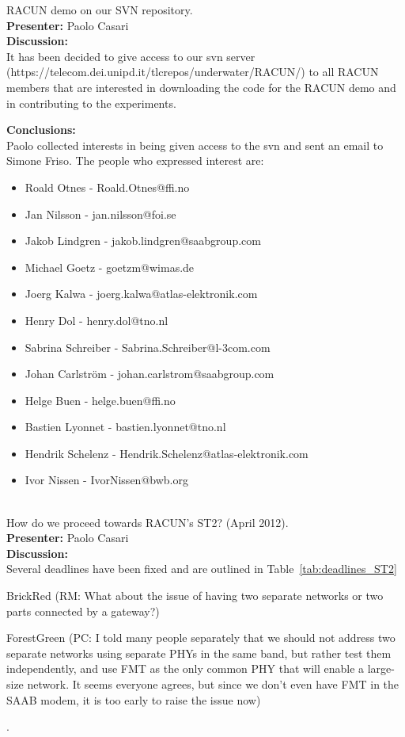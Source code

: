 \documentclass[11pt,journal,draftclsnofoot,onecolumn,twoside,letterpaper]{IEEEtran}
\newcommand{\RM}[1]{\begin{color}{BrickRed} (RM: #1) \end{color}}
\newcommand{\PC}[1]{\begin{color}{ForestGreen} (PC: #1) \end{color}}
\theoremstyle{definition} \newtheorem{definition}[]{Definition}
\theoremstyle{theorem} \newtheorem{theorem}[]{Theorem}
\begin{document}
 RACUN demo on our SVN repository.\\
{\bf Presenter:} Paolo Casari \\
{\bf Discussion:} \\

It has been decided to give access to our svn server (https://telecom.dei.unipd.it/tlcrepos/underwater/RACUN/) to all RACUN members that are interested in downloading the code for the RACUN demo and in contributing to the experiments.

{\bf Conclusions:} \\
Paolo collected interests in being given access to the svn and sent an email to Simone Friso. The people who expressed interest are:
\begin{itemize}
 \item    Roald Otnes  -  Roald.Otnes@ffi.no
 \item    Jan Nilsson  -  jan.nilsson@foi.se
 \item    Jakob Lindgren  -  jakob.lindgren@saabgroup.com
 \item    Michael Goetz  -  goetzm@wimas.de
 \item    Joerg Kalwa  -  joerg.kalwa@atlas-elektronik.com
 \item    Henry Dol  -  henry.dol@tno.nl
 \item    Sabrina Schreiber  -  Sabrina.Schreiber@l-3com.com
 \item    Johan Carlstr\"{o}m  -  johan.carlstrom@saabgroup.com
 \item    Helge Buen  -  helge.buen@ffi.no
 \item    Bastien Lyonnet  -  bastien.lyonnet@tno.nl
 \item    Hendrik Schelenz  -  Hendrik.Schelenz@atlas-elektronik.com
 \item    Ivor Nissen  -  IvorNissen@bwb.org
\end{itemize}
\  \\


 How do we proceed towards RACUN's ST2? (April 2012).\\
{\bf Presenter:} Paolo Casari \\
{\bf Discussion:} \\

Several deadlines have been fixed and are outlined in Table~\ref{tab:deadlines_ST2} \RM{What about the issue of having two separate networks or two parts connected by a gateway?} \PC{I told many people separately that we should not address two separate networks using separate PHYs in the same band, but rather test them independently, and use FMT as the only common PHY that will enable a large-size network. It seems everyone agrees, but since we don't even have FMT in the SAAB modem, it is too early to raise the issue now}.
\end{document}

